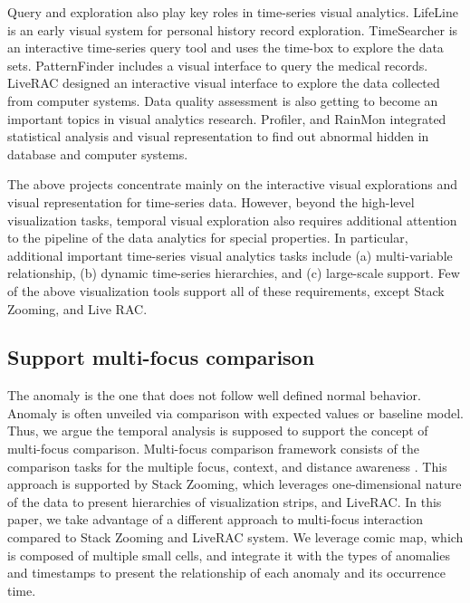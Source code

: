 \documentclass{vgtc}                          %
\begin{document}
Query and exploration also play key roles in time-series visual analytics. LifeLine\cite{plaisant1996lifelines} is an early visual system for personal history record exploration. TimeSearcher\cite{hochheiser2004dynamic} is an interactive time-series query tool and uses the time-box to explore the data sets. PatternFinder\cite{fails2006visual} includes a visual interface to query the medical records. LiveRAC\cite{mclachlan2008liverac} designed an interactive visual interface to explore the data collected from computer systems. Data quality assessment is also getting to become an important topics in visual analytics research. Profiler\cite{Kandel2012}, and RainMon\cite{shafer2012rainmon} integrated statistical analysis and visual representation to find out abnormal hidden in database and computer systems. 
	
The above projects concentrate mainly on the interactive visual explorations and visual representation for time-series data. However, beyond the high-level visualization tasks, temporal visual exploration also requires additional attention to the pipeline of the data analytics for special properties. In particular, additional important time-series visual analytics tasks include (a) multi-variable relationship, (b) dynamic time-series hierarchies, and (c) large-scale support\cite{javed2010stack}. Few of the above visualization tools support all of these requirements, except Stack Zooming\cite{javed2010stack}, and Live RAC\cite{mclachlan2008liverac}. 
	
\subsection{Support multi-focus comparison}

The anomaly is the one that does not follow well defined normal behavior\cite{Chandola2009}. Anomaly is often unveiled via comparison with expected values or baseline model. Thus, we argue the temporal analysis is supposed to support the concept of multi-focus comparison. Multi-focus comparison framework consists of the comparison tasks for the multiple focus, context, and distance awareness \cite{javed2010stack, elmqvist2008melange}. This approach is supported by Stack Zooming\cite{javed2010stack}, which leverages one-dimensional nature of the data to present hierarchies of visualization strips, and LiveRAC\cite{mclachlan2008liverac}. In this paper, we take advantage of a different approach to multi-focus interaction compared to Stack Zooming and LiveRAC system. We leverage comic map, which is composed of multiple small cells, and integrate it with the types of anomalies and timestamps to present the relationship of each anomaly and its occurrence time. 
	
\end{document}
